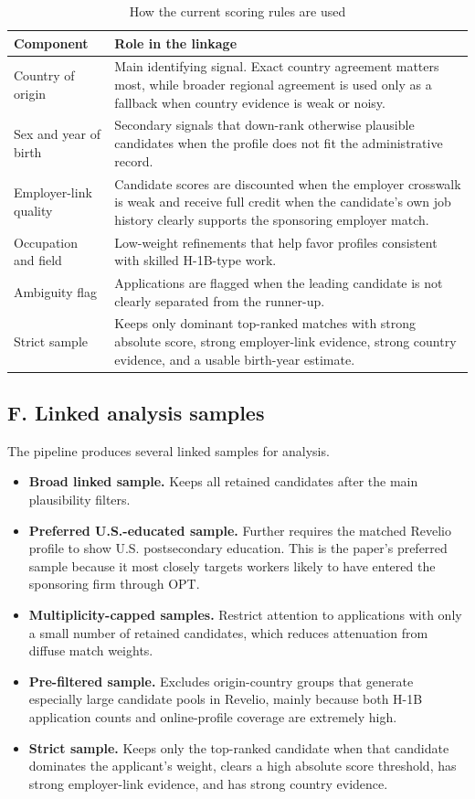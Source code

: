\begin{table}[H]
\centering
\caption{How the current scoring rules are used}
\label{tab:link_params}
\begin{tabularx}{\textwidth}{@{}l X@{}}
\toprule
Component & Role in the linkage \\
\midrule
Country of origin & Main identifying signal. Exact country agreement matters most, while broader regional agreement is used only as a fallback when country evidence is weak or noisy. \\
Sex and year of birth & Secondary signals that down-rank otherwise plausible candidates when the profile does not fit the administrative record. \\
Employer-link quality & Candidate scores are discounted when the employer crosswalk is weak and receive full credit when the candidate's own job history clearly supports the sponsoring employer match. \\
Occupation and field & Low-weight refinements that help favor profiles consistent with skilled H-1B-type work. \\
Ambiguity flag & Applications are flagged when the leading candidate is not clearly separated from the runner-up. \\
Strict sample & Keeps only dominant top-ranked matches with strong absolute score, strong employer-link evidence, strong country evidence, and a usable birth-year estimate. \\
\bottomrule
\end{tabularx}
\end{table}

\subsection{F. Linked analysis samples}

The pipeline produces several linked samples for analysis.

\begin{itemize}
    \item \textbf{Broad linked sample.} Keeps all retained candidates after the main plausibility filters.
    \item \textbf{Preferred U.S.-educated sample.} Further requires the matched Revelio profile to show U.S. postsecondary education. This is the paper's preferred sample because it most closely targets workers likely to have entered the sponsoring firm through OPT.
    \item \textbf{Multiplicity-capped samples.} Restrict attention to applications with only a small number of retained candidates, which reduces attenuation from diffuse match weights.
    \item \textbf{Pre-filtered sample.} Excludes origin-country groups that generate especially large candidate pools in Revelio, mainly because both H-1B application counts and online-profile coverage are extremely high.
    \item \textbf{Strict sample.} Keeps only the top-ranked candidate when that candidate dominates the applicant's weight, clears a high absolute score threshold, has strong employer-link evidence, and has strong country evidence.
\end{itemize}

